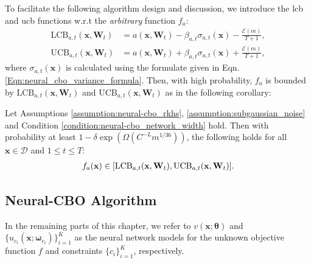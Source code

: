 To facilitate the following algorithm design and discussion, we introduce the \acf{lcb} and \acf{ucb} functions w.r.t the \textit{arbitrary} function $f_a$: 
\begin{align*}
\text{LCB}_{a,t}(\mathbf{x}, \mathbf{W}_{t}) &= a(\mathbf{x}, \mathbf{W}_{t}) - \beta_{a,t} \sigma_{a,t} (\mathbf{x}) - \frac{\mathcal{E}(m)}{T+1},
\\
\text{UCB}_{a,t}(\mathbf{x}, \mathbf{W}_{t}) &= a(\mathbf{x}, \mathbf{W}_{t}) + \beta_{a,t} \sigma_{a,t} (\mathbf{x}) + \frac{\mathcal{E}(m)}{T+1},  
\end{align*}
where $\sigma_{a,t}(\mathbf{x})$ is calculated using the formulate given in Eqn. \eqref{Eqn:neural_cbo_variance_formula}. Then, with high probability,  $f_a$ is bounded by $\text{LCB}_{a,t}(\mathbf{x}, \mathbf{W}_{t})$ and $\text{UCB}_{a,t}(\mathbf{x}, \mathbf{W}_{t})$ as in the following corollary:
\begin{corollary}
\label{corrolary:f_in_lcb_ucb}
Let Assumptions \ref{assumption:neural-cbo_rkhs}, \ref{assumption:subgaussian_noise} and Condition \ref{condition:neural-cbo_network_width} hold. Then with probability at least $1 - \delta \exp (\Omega(C^{-L} m^{1/36}))$, the following holds for all $\mathbf{x} \in \mathcal{D}$
and $1 \le t \le T$:
\begin{align*}
    f_a (\mathbf{x}) \in [\textnormal{LCB}_{a,t}(\mathbf{x}, \mathbf{W}_{t}), \textnormal{UCB}_{a,t}(\mathbf{x}, \mathbf{W}_{t})].
\end{align*}
\end{corollary}
\subsection{Neural-CBO Algorithm}
In the remaining parts of this chapter, we refer to $v(\mathbf{x}; \boldsymbol{\theta})$ and $\{u_{c_i}(\mathbf{x}; \boldsymbol{\omega}_{c_i})\}_{i=1}^K$ as the neural network models for the unknown objective function $f$ and constraints $\{c_i\}_{i=1}^K$, respectively. 

